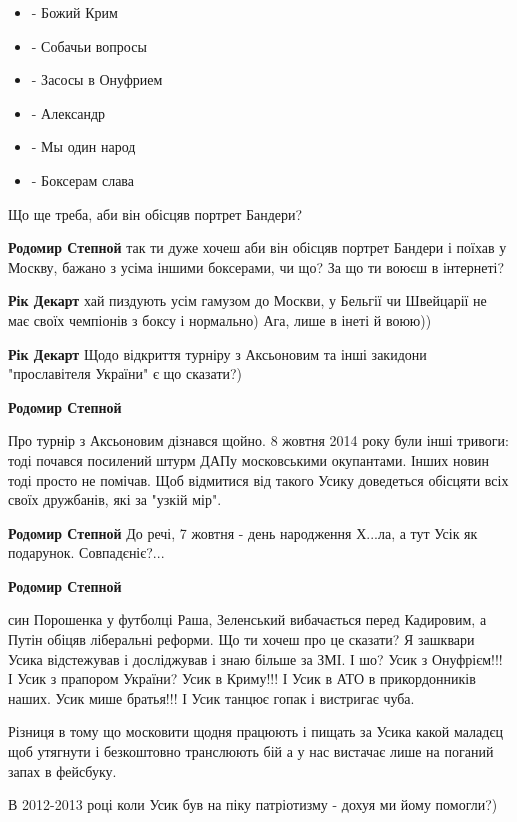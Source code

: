\begin{itemize}
\begin{itemize}
  \item - Божий Крим
  \item - Собачьи вопросы
  \item - Засосы в Онуфрием
  \item - Александр
  \item - Мы один народ
  \item - Боксерам слава
\end{itemize}

Що ще треба, аби він обісцяв портрет Бандери?

\begin{itemize} %
\textbf{Родомир Степной} так ти дуже хочеш аби він обісцяв портрет Бандери і поїхав у Москву, бажано з усіма іншими боксерами, чи що?
За що ти воюєш в інтернеті?

\textbf{Рік Декарт} хай пиздують усім гамузом до Москви, у Бельгії чи Швейцарії не має своїх чемпіонів з боксу і нормально)
Ага, лише в інеті й воюю))

\textbf{Рік Декарт} Щодо відкриття турніру з Аксьоновим та інші закидони "прославітеля України" є що сказати?)

\textbf{Родомир Степной} 

Про турнір з Аксьоновим дізнався щойно. 8 жовтня 2014 року були інші тривоги:
тоді почався посилений штурм ДАПу московськими окупантами. Інших новин тоді
просто не помічав. Щоб відмитися від такого Усику доведеться обісцяти всіх
своїх дружбанів, які за "узкій мір".


\textbf{Родомир Степной} До речі, 7 жовтня - день народження Х...ла, а тут Усік як подарунок. Совпадєніє?...

\textbf{Родомир Степной} 

\obeycr
син Порошенка у футболці Раша, Зеленський вибачається перед Кадировим, а Путін обіцяв ліберальні реформи.
Що ти хочеш про це сказати?
Я зашквари Усика відстежував і досліджував і знаю більше за ЗМІ.
І шо?
Усик з Онуфрієм!!!
І Усик з прапором України?
Усик в Криму!!! І Усик в АТО в прикордонників наших.
Усик мише братья!!! І Усик танцює гопак і вистригає чуба.
\restorecr

Різниця в тому що московити щодня працюють і пищать за Усика какой маладєц щоб
утягнути і безкоштовно транслюють бій а у нас вистачає лише на поганий запах в
фейсбуку.

В 2012-2013 році коли Усик був на піку патріотизму - дохуя ми йому помогли?)


\end{itemize}
\end{itemize}
